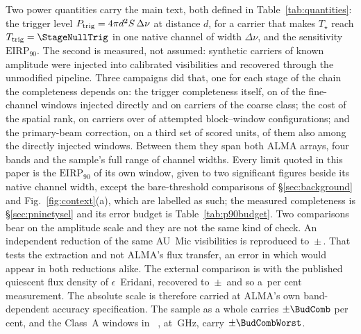 Two power quantities carry the main text, both defined in
Table~\ref{tab:quantities}: the trigger level $P_{\rm trig} = 4\pi
d^{2}S\,\Delta\nu$ at distance $d$, for a carrier that makes $T_\star$ reach
$T_{\rm trig}=\StageNullTrig$ in one native channel of width $\Delta\nu$,
and the sensitivity $\mathrm{EIRP}_{90}$. The second is measured, not
assumed: synthetic carriers of known amplitude were injected into
calibrated visibilities and recovered through the unmodified pipeline.
Three campaigns did that, one for each stage of the chain the completeness
depends on: the trigger completeness itself, on \MkInjCompWin{} of the
\MkInjCompDenom{} fine-channel windows injected directly and on
\SensNToneCoarse{} carriers of the coarse class; the cost of the spatial
rank, on \SelNTone{} carriers over \MkInjSelUnit{} of \MkInjSelTotal{}
attempted block--window configurations; and the primary-beam correction, on a
third set of \MkInjBeamUnit{} scored units, \MkInjBeamShared{} of them also
among the directly injected windows. Between them they span both ALMA arrays,
four bands and the sample's full range of channel widths. Every limit quoted in
this paper is the $\mathrm{EIRP}_{90}$ of its own window, given to two
significant figures beside its native channel width, except the
bare-threshold comparisons of \S\ref{sec:background} and
Fig.~\ref{fig:context}(a), which are labelled as such; the measured
completeness is \S\ref{sec:pninetysel} and its error
budget is Table~\ref{tab:p90budget}. Two comparisons bear on the amplitude
scale and they are not the same kind of check. An independent reduction of the same AU~Mic visibilities is reproduced to
\PxJanRatio\,$\pm$\,\PxJanRatioErr. That tests the extraction and not
ALMA's flux transfer, an error in which would appear in both reductions
alike. The external comparison is with the published quiescent flux density
of $\epsilon$~Eridani, recovered to
\PxEpsRatio\,$\pm$\,\PxEpsRatioErr{} \citep{Burton2022} and so a
\SbEpsPct\,per cent measurement. The absolute scale is therefore carried at ALMA's own band-dependent
accuracy specification. The sample as a whole carries $\pm\BudComb$ per
cent, and the \BudNHiWin{} Class~A windows in
\BudHiBandWord~\BudHiBands, at \BudHiGHzList\,GHz, carry
$\pm\BudCombWorst$.


